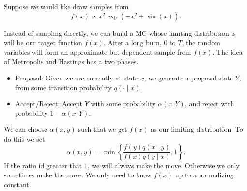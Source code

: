 \begin{exam} \label{exam: MC_samp_1}
    Suppose we would like draw samples from
    \[
        f(x) \propto x^2 \exp \left( -x^2 + \sin (x) \right).
    \]
\end{exam}

Instead of sampling directly, we can build a MC whose limiting distribution is will be our target function $f(x)$. After a long burn, $0$ to $T$, the random variables will form an approximate but dependent sample from $f(x)$. The idea of Metropolis and Hastings has a two phases.
\begin{itemize}
    \item Proposal: Given we are currently at state $x$, we generate a proposal state $Y$, from some transition probability $q(\cdot  \mid x)$.
    \item Accept/Reject: Accept $Y$ with some probability $\alpha (x,Y)$, and reject with probability $1 - \alpha (x,Y)$.
\end{itemize}
We can choose $\alpha (x,y)$ such that we get $f(x)$ as our limiting distribution. To do this we set
\[
    \alpha (x,y) = \min \left\{
    \frac{f(y) q(x \mid y)}{f(x) q(y \mid x)} , 1
    \right\}.
\]
If the ratio id greater that $1$, we will always make the move. Otherwise we only sometimes make the move. We only need to know $f(x)$ up to a normalizing constant.

